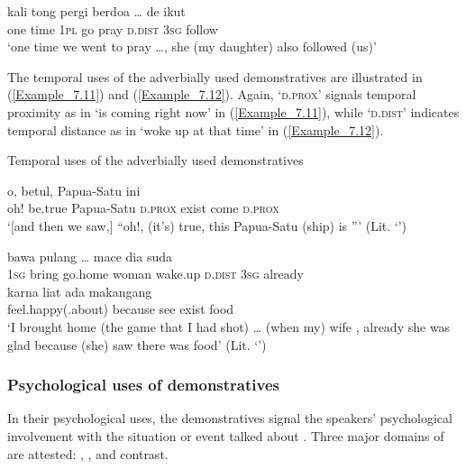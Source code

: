 {\ea
\label{Example_7.10}
 {kali} {tong} {pergi} {berdoa} {\ldots} {} {de} {ikut}\\ %
 one  time  \textsc{1pl}  go  pray { }   \textsc{d.dist}  \textsc{3sg}  follow\\
\glt 
‘one time we went to pray \ldots,  she (my daughter) also followed (us)’ \textstyleExampleSource{[080917-008-NP.0175]}
\z



The temporal uses of the adverbially used demonstratives are illustrated in (\ref{Example_7.11}) and (\ref{Example_7.12}). Again,  ‘\textsc{d.prox}’ signals temporal proximity as in  ‘is coming right now’ in (\ref{Example_7.11}), while  ‘\textsc{d.dist}’ indicates temporal distance as in  ‘woke up at that time’ in (\ref{Example_7.12}).


\begin{styleExampleTitle}
Temporal uses of the adverbially used demonstratives
\end{styleExampleTitle}

\ea
\label{Example_7.11}
\gll {\ldots} {o,} {betul,} {Papua-Satu} {ini} {} {} {}\\ %
 { }   oh!  be.true  Papua-Satu  \textsc{d.prox}  exist  come  \textsc{d.prox}\\
\glt 
‘[and then we saw,] ``oh!, (it’s) true, this Papua-Satu (ship) is ''' (Lit. ‘’) \textstyleExampleSource{[080917-008-NP.0130]}
\z

\ea
\label{Example_7.12}
 {bawa} {{pulang}} {\ldots} {{mace}} {{}} {} {dia} {suda}\\ %
 \textsc{1sg}  bring  {go.home}  { }  {woman}  {wake.up}  \textsc{d.dist}  \textsc{3sg}  already\\
  {karna}  liat  {ada}  {makangang}\\
 {feel.happy(.about)}  {because}  see  {exist}  {food}\\
\glt
‘I brought home (the game that I had shot) {\ldots} (when my) wife , already she was glad because (she) saw there was food’ (Lit. ‘’) \textstyleExampleSource{[080919-004-NP.0030/0032]}
\z


\subsubsection[Psychological uses of demonstratives]{Psychological uses of demonstratives}
\label{Para_7.1.2.3}
In their psychological uses, the demonstratives signal the speakers’ psychological involvement with the situation or event talked about \citep[347]{Lakoff.1974}. Three major domains of  are attested: , , and contrast.


}
